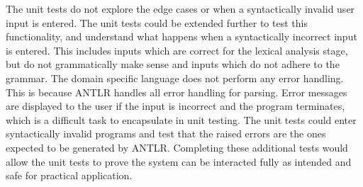 The unit tests do not explore the edge cases or when a syntactically invalid user input is entered. The unit tests could be extended further to test this functionality, and understand what happens when a syntactically incorrect input is entered. This includes inputs which are correct for the lexical analysis stage, but do not grammatically make sense and inputs which do not adhere to the grammar. The domain specific language does not perform any error handling. This is because ANTLR handles all error handling for parsing. Error messages are displayed to the user if the input is incorrect and the program terminates, which is a difficult task to encapsulate in unit testing. The unit tests could enter syntactically invalid programs and test that the raised errors are the ones expected to be generated by ANTLR. Completing these additional tests would allow the unit tests to prove the system can be interacted fully as intended and safe for practical application. 




